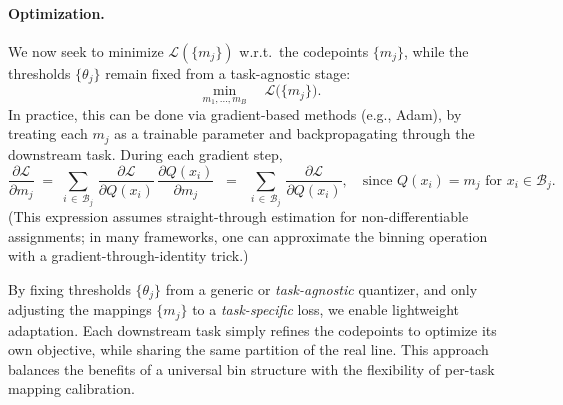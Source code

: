 \paragraph{Optimization.} 
We now seek to minimize \(\mathcal{L}(\{m_j\})\) w.r.t.\ the codepoints \(\{m_j\}\), while the thresholds \(\{\theta_j\}\) remain fixed from a task-agnostic stage:
\[
   \min_{m_1, \dots, m_B} \quad \mathcal{L}\bigl(\{m_j\}\bigr).
\]
In practice, this can be done via gradient-based methods (e.g., Adam), by treating each \(m_j\) as a trainable parameter and backpropagating through the downstream task. 
During each gradient step,
\[
   \frac{\partial \mathcal{L}}{\partial m_j}
   \;=\;
   \sum_{i \,\in\, \mathcal{B}_j} \,
       \frac{\partial \mathcal{L}}{\partial Q(x_i)}
       \,\frac{\partial Q(x_i)}{\partial m_j}
   \;\;=\;\;
   \sum_{i \,\in\, \mathcal{B}_j} \,
       \frac{\partial \mathcal{L}}{\partial Q(x_i)},
   \quad
   \text{since }Q(x_i)=m_j \text{ for } x_i\in \mathcal{B}_j.
\]
(This expression assumes straight-through estimation for non-differentiable assignments; in many frameworks, one can approximate the binning operation with a gradient-through-identity trick.)

By fixing thresholds \(\{\theta_j\}\) from a generic or \emph{task-agnostic} quantizer, and only adjusting the mappings \(\{m_j\}\) to a \emph{task-specific} loss, we enable lightweight adaptation. Each downstream task simply refines the codepoints to optimize its own objective, while sharing the same partition of the real line. This approach balances the benefits of a universal bin structure with the flexibility of per-task mapping calibration.